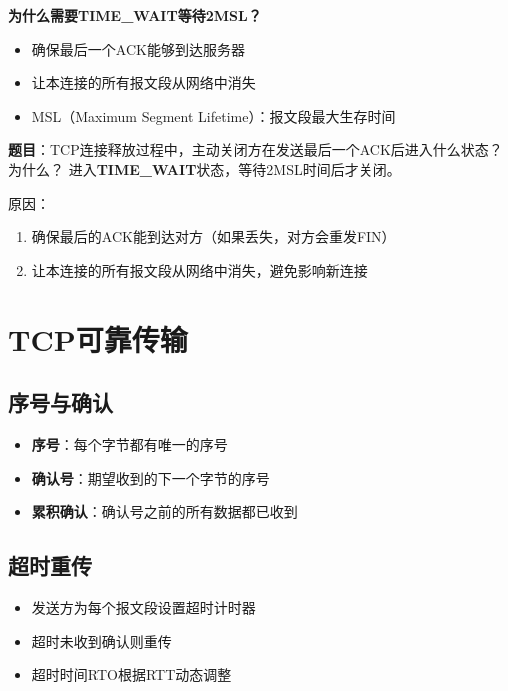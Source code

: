 \begin{notebox}
\textbf{为什么需要TIME\_WAIT等待2MSL？}
\begin{itemize}[itemsep=0pt]
    \item 确保最后一个ACK能够到达服务器
    \item 让本连接的所有报文段从网络中消失
    \item MSL（Maximum Segment Lifetime）：报文段最大生存时间
\end{itemize}
\end{notebox}

\begin{examplebox}[例题5.1 TCP连接状态]
\textbf{题目}：TCP连接释放过程中，主动关闭方在发送最后一个ACK后进入什么状态？为什么？
\tcblower
进入\textbf{TIME\_WAIT}状态，等待2MSL时间后才关闭。

原因：
\begin{enumerate}[itemsep=0pt]
    \item 确保最后的ACK能到达对方（如果丢失，对方会重发FIN）
    \item 让本连接的所有报文段从网络中消失，避免影响新连接
\end{enumerate}
\end{examplebox}

\section{TCP可靠传输}
\subsection{序号与确认}
\begin{itemize}[leftmargin=2em,itemsep=0pt]
    \item \textbf{序号}：每个字节都有唯一的序号
    \item \textbf{确认号}：期望收到的下一个字节的序号
    \item \textbf{累积确认}：确认号之前的所有数据都已收到
\end{itemize}

\subsection{超时重传}
\begin{itemize}[leftmargin=2em,itemsep=0pt]
    \item 发送方为每个报文段设置超时计时器
    \item 超时未收到确认则重传
    \item 超时时间RTO根据RTT动态调整
\end{itemize}

